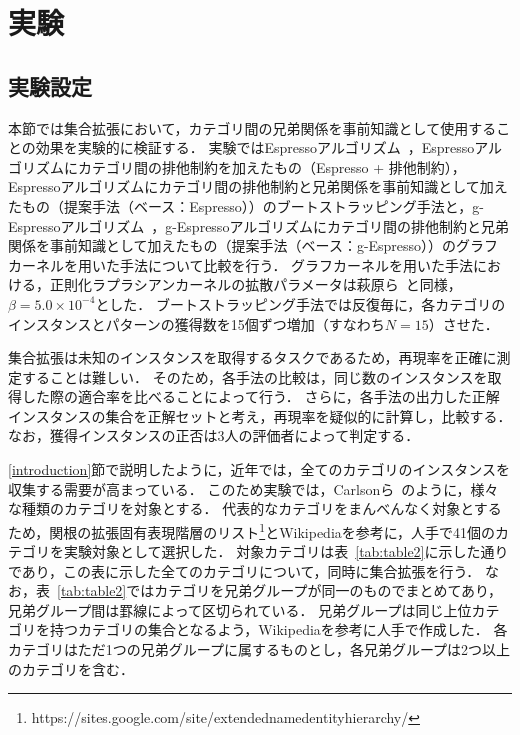 \documentclass[japanese]{jnlp_1.4}
\begin{document}
\section{実験}

\subsection{実験設定}

本節では集合拡張において，カテゴリ間の兄弟関係を事前知識として使用することの効果を実験的に検証する．
実験ではEspressoアルゴリズム~\cite{pantel-pennacchiotti:2006:COLACL}，Espressoアルゴリズムにカテゴリ間の排他制約を加えたもの（Espresso + 排他制約），Espressoアルゴリズムにカテゴリ間の排他制約と兄弟関係を事前知識として加えたもの（提案手法（ベース：Espresso））のブートストラッピング手法と，g-Espressoアルゴリズム~\cite{masato_hagiwara:2011}，g-Espressoアルゴリズムにカテゴリ間の排他制約と兄弟関係を事前知識として加えたもの（提案手法（ベース：g-Espresso））のグラフカーネルを用いた手法について比較を行う．
グラフカーネルを用いた手法における，正則化ラプラシアンカーネルの拡散パラメータは萩原ら~\cite{masato_hagiwara:2011}と同様，$\beta = 5.0 \times 10^{-4}$とした．
ブートストラッピング手法では反復毎に，各カテゴリのインスタンスとパターンの獲得数を15個ずつ増加（すなわち$N=15$）させた．

集合拡張は未知のインスタンスを取得するタスクであるため，再現率を正確に測定することは難しい．
そのため，各手法の比較は，同じ数のインスタンスを取得した際の適合率を比べることによって行う．
さらに，各手法の出力した正解インスタンスの集合を正解セットと考え，再現率を疑似的に計算し，比較する．
なお，獲得インスタンスの正否は3人の評価者によって判定する．

\ref{introduction}節で説明したように，近年では，全てのカテゴリのインスタンスを収集する需要が高まっている．
このため実験では，Carlsonら~\cite{Carlson10towardan}のように，様々な種類のカテゴリを対象とする．
代表的なカテゴリをまんべんなく対象とするため，関根の拡張固有表現階層のリスト\footnote{https://sites.google.com/site/extendednamedentityhierarchy/}とWikipediaを参考に，人手で41個のカテゴリを実験対象として選択した．
対象カテゴリは表~\ref{tab:table2}に示した通りであり，この表に示した全てのカテゴリについて，同時に集合拡張を行う．
なお，表~\ref{tab:table2}ではカテゴリを兄弟グループが同一のものでまとめてあり，兄弟グループ間は罫線によって区切られている．
兄弟グループは同じ上位カテゴリを持つカテゴリの集合となるよう，Wikipediaを参考に人手で作成した．
各カテゴリはただ1つの兄弟グループに属するものとし，各兄弟グループは2つ以上のカテゴリを含む．
\end{document}
